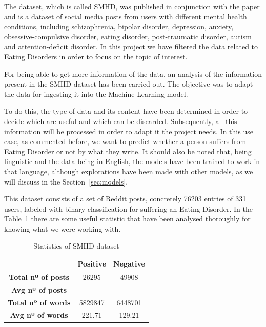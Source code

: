 The dataset, which is called SMHD, was published in conjunction with the paper and is a dataset of social media posts from users with different mental health conditions, including schizophrenia, bipolar disorder, depression, anxiety, obsessive-compulsive disorder, eating disorder, post-traumatic disorder, autism and attention-deficit disorder. In this project we have filtered the data related to Eating Disorders in order to focus on the topic of interest.



For being able to get more information of the data, an analysis of the information present in the SMHD dataset has been carried out. The objective was to adapt the data for ingesting it into the Machine Learning model. 

To do this, the type of data and its content have been determined in order to decide which are useful and which can be discarded. Subsequently, all this information will be processed in order to adapt it the project needs. In this use case, as commented before, we want to predict whether a person suffers from Eating Disorder or not by what they write. It should also be noted that, being linguistic and the data being in English, the models have been trained to work in that language, although explorations have been made with other models, as we will discuss in the Section~\ref{sec:models}.

This dataset consists of a set of Reddit posts, concretely 76203 entries of 331 users, labeled with binary classification for suffering an Eating Disorder. In the Table~\ref{tab:SMHDstatistics} there are some useful statistic that have been analysed thoroughly for knowing what we were working with.

\begin{table}[htp]
\centering
\begin{tabular}{|c|c|c|}
\hline
                           & \textbf{Positive} & \textbf{Negative} \\ \hline
\textbf{Total nº of posts} & 26295             & 49908             \\ \hline
\textbf{Avg nº of posts}   &                   &                   \\ \hline
\textbf{Total nº of words} & 5829847           & 6448701           \\ \hline
\textbf{Avg nº of words}   & 221.71            & 129.21            \\ \hline
\end{tabular}
\caption{Statistics of SMHD dataset}
\label{tab:SMHDstatistics}
\end{table}

